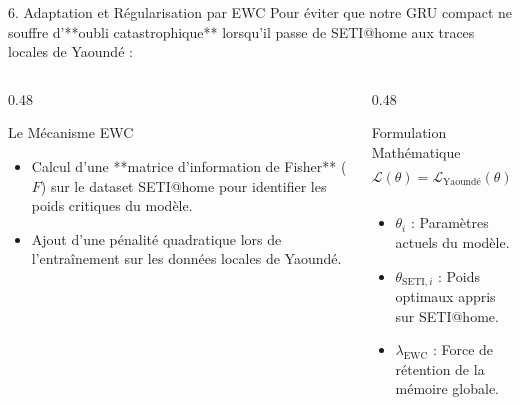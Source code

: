 \documentclass[10pt,aspectratio=169]{beamer}
\begin{document}
\begin{frame}{6. Adaptation et Régularisation par EWC}
  Pour éviter que notre GRU compact ne souffre d'**oubli catastrophique** lorsqu'il passe de SETI@home aux traces locales de Yaoundé :
  
  \begin{columns}[T]
    \begin{column}{0.48\textwidth}
      \begin{block}{Le Mécanisme EWC}
        \begin{itemize}
          \item Calcul d'une **matrice d'information de Fisher** ($F$) sur le dataset SETI@home pour identifier les poids critiques du modèle.
          \item Ajout d'une pénalité quadratique lors de l'entraînement sur les données locales de Yaoundé.
        \end{itemize}
      \end{block}
    \end{column}
    
    \begin{column}{0.48\textwidth}
      \begin{exampleblock}{Formulation Mathématique}
        $$\mathcal{L}(\theta) = \mathcal{L}_{\text{Yaoundé}}(\theta) + \sum_{i} \frac{\lambda_{\text{EWC}}}{2} F_i (\theta_i - \theta_{\text{SETI}, i})^2$$
        \begin{itemize}
          \item $\theta_i$ : Paramètres actuels du modèle.
          \item $\theta_{\text{SETI}, i}$ : Poids optimaux appris sur SETI@home.
          \item $\lambda_{\text{EWC}}$ : Force de rétention de la mémoire globale.
        \end{itemize}
      \end{exampleblock}
    \end{column}
  \end{columns}
\end{frame}
\end{document}
